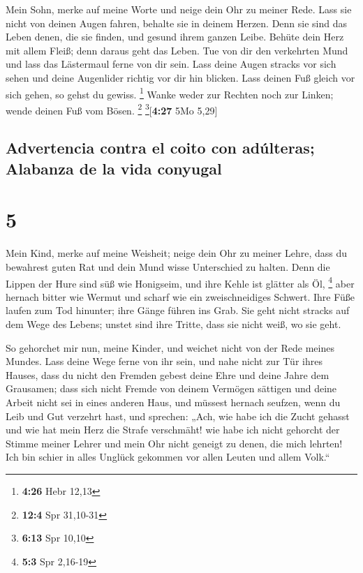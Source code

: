  Mein Sohn, merke auf meine Worte und neige dein Ohr zu
meiner Rede.  Lass sie nicht von deinen Augen fahren,
behalte sie in deinem Herzen.  Denn sie sind das Leben
denen, die sie finden, und gesund ihrem ganzen Leibe. 
Behüte dein Herz mit allem Fleiß; denn daraus geht das Leben.
 Tue von dir den verkehrten Mund und lass das Lästermaul
ferne von dir sein.  Lass deine Augen stracks vor sich
sehen und deine Augenlider richtig vor dir hin blicken. 
Lass deinen Fuß gleich vor sich gehen, so gehst du gewiss. \footnote{\textbf{4:26}
  Hebr 12,13}  Wanke weder zur Rechten noch zur Linken;
wende deinen Fuß vom Bösen. \footnote{\textbf{12:4} Spr 31,10-31}
\footnote{\textbf{6:13} Spr 10,10}{[}\textbf{4:27} 5Mo 5,29{]}

\hypertarget{advertencia-contra-el-coito-con-aduxfalteras-alabanza-de-la-vida-conyugal}{%
\subsection{Advertencia contra el coito con adúlteras; Alabanza de la
vida
conyugal}\label{advertencia-contra-el-coito-con-aduxfalteras-alabanza-de-la-vida-conyugal}}

\hypertarget{section-4}{%
\section{5}\label{section-4}}

 Mein Kind, merke auf meine Weisheit; neige dein Ohr zu
meiner Lehre,  dass du bewahrest guten Rat und dein Mund
wisse Unterschied zu halten.  Denn die Lippen der Hure
sind süß wie Honigseim, und ihre Kehle ist glätter als Öl, \footnote{\textbf{5:3}
  Spr 2,16-19}  aber hernach bitter wie Wermut und scharf
wie ein zweischneidiges Schwert.  Ihre Füße laufen zum Tod
hinunter; ihre Gänge führen ins Grab.  Sie geht nicht
stracks auf dem Wege des Lebens; unstet sind ihre Tritte, dass sie nicht
weiß, wo sie geht.

 So gehorchet mir nun, meine Kinder, und weichet nicht von
der Rede meines Mundes.  Lass deine Wege ferne von ihr
sein, und nahe nicht zur Tür ihres Hauses,  dass du nicht
den Fremden gebest deine Ehre und deine Jahre dem Grausamen;
 dass sich nicht Fremde von deinem Vermögen sättigen und
deine Arbeit nicht sei in eines anderen Haus,  und
müssest hernach seufzen, wenn du Leib und Gut verzehrt hast,
 und sprechen: „Ach, wie habe ich die Zucht gehasst und
wie hat mein Herz die Strafe verschmäht!  wie habe ich
nicht gehorcht der Stimme meiner Lehrer und mein Ohr nicht geneigt zu
denen, die mich lehrten!  Ich bin schier in alles Unglück
gekommen vor allen Leuten und allem Volk.``

